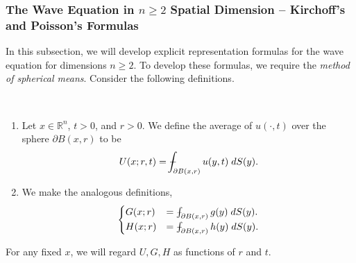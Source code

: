 \documentclass{article}
\def\Xint#1{\mathchoice
	{\XXint\displaystyle\textstyle{#1}}%
	{\XXint\textstyle\scriptstyle{#1}}%
	{\XXint\scriptstyle\scriptscriptstyle{#1}}%
	{\XXint\scriptscriptstyle\scriptscriptstyle{#1}}%
	\!\int}
\def\XXint#1#2#3{{\setbox0=\hbox{$#1{#2#3}{\int}$ }
		\vcenter{\hbox{$#2#3$ }}\kern-0.6\wd0}}
\def\dashint{\Xint-}
\begin{document}
\subsubsection{The Wave Equation in \texorpdfstring{$n\geq 2$}{>2} Spatial Dimension -- Kirchoff's and Poisson's Formulas}
In this subsection, we will develop explicit representation formulas for the wave equation for dimensions $n \geq 2$. To develop these formulas, we require the \textit{method of spherical means}. Consider the following definitions. 

\begin{definition}
	$ $\newline \vspace{-0.25cm}
	\begin{enumerate}[itemsep =-2pt,label = (\roman{*})]
		\item Let $x \in \mathbb{R}^{n}$, $t > 0$, and $r > 0$. We define the average of $u(\cdot, t)$ over the sphere $\partial B(x, r)$ to be 
		\begin{equation}
			U(x;r, t) = \dashint_{\partial B(x, r)} u(y,t)\;dS(y).
		\end{equation}
		\item We make the analogous definitions, 
		\begin{equation}
			\begin{cases}
				G(x; r) &= \dashint_{\partial B(x,r)}g(y)\;dS(y). \\
				H(x; r) &= \dashint_{\partial B(x,r)}h(y)\;dS(y). 
			\end{cases}
		\end{equation}
	\end{enumerate}
	For any fixed $x$, we will regard $U, G, H$ as functions of $r$ and $t$. 
\end{definition}
\end{document}
